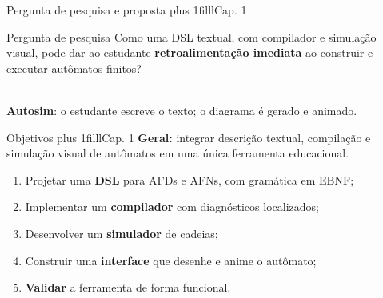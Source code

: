 \documentclass[aspectratio=169,12pt]{beamer}
\newcommand{\notexto}[1]{\hskip 0pt plus 1filll{\normalfont\small\color{white!85!acento}#1}}
\begin{document}
\begin{frame}{Pergunta de pesquisa e proposta\notexto{Cap. 1}}
  \begin{block}{Pergunta de pesquisa}
    Como uma DSL textual, com compilador e simulação visual, pode dar ao estudante
    \textbf{retroalimentação imediata} ao construir e executar autômatos finitos?
  \end{block}
  \vspace{8pt}
  \centering
  \\[8pt]
  \textbf{Autosim}: o estudante escreve o texto; o diagrama é gerado e animado.
\end{frame}

\begin{frame}{Objetivos\notexto{Cap. 1}}
  \textbf{Geral:} integrar descrição textual, compilação e simulação visual de autômatos em
  uma única ferramenta educacional.
  \vspace{6pt}
  \begin{enumerate}
    \item Projetar uma \textbf{DSL} para AFDs e AFNs, com gramática em EBNF;
    \item Implementar um \textbf{compilador} com diagnósticos localizados;
    \item Desenvolver um \textbf{simulador} de cadeias;
    \item Construir uma \textbf{interface} que desenhe e anime o autômato;
    \item \textbf{Validar} a ferramenta de forma funcional.
  \end{enumerate}
\end{frame}

\end{document}
